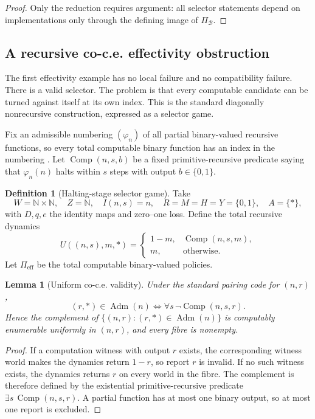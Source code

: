 \documentclass[11pt]{article}
\theoremstyle{plain}
\newtheorem{lemma}[theorem]{Lemma}
\theoremstyle{definition}
\newtheorem{definition}[theorem]{Definition}
\theoremstyle{remark}
\newcommand{\N}{\mathbb{N}}
\newcommand{\Adm}{\operatorname{Adm}}
\begin{document}
\begin{proof}
Only the reduction requires argument: all selector statements depend on
implementations only through the defining image of $\Pi_{\mathcal B}$.
\end{proof}

\subsection{A recursive co-c.e. effectivity obstruction}

The first effectivity example has no local failure and no compatibility failure.
There is a valid selector. The problem is that every computable candidate can be
turned against itself at its own index. This is the standard diagonally
nonrecursive construction, expressed as a selector game.

Fix an admissible numbering $(\varphi_n)$ of all partial binary-valued recursive
functions, so every total computable binary function has an index in the
numbering \cite{rogers}. Let $\operatorname{Comp}(n,s,b)$ be a fixed
primitive-recursive predicate saying that $\varphi_n(n)$ halts within $s$ steps
with output $b\in\{0,1\}$.

\begin{definition}[Halting-stage selector game]\label{def:Kgame}
Take
\[
W=\N\times\N,\quad Z=\N,\quad I(n,s)=n,
\quad R=M=H=Y=\{0,1\},\quad A=\{\ast\},
\]
with $D,q,e$ the identity maps and zero--one loss. Define the total recursive
dynamics
\[
U((n,s),m,\ast)=
\begin{cases}
1-m,&\operatorname{Comp}(n,s,m),\\
m,&\text{otherwise}.
\end{cases}
\]
Let $\Pi_{\mathrm{eff}}$ be the total computable binary-valued policies.
\end{definition}

\begin{lemma}[Uniform co-c.e. validity]\label{lem:Kfibres}
Under the standard pairing code for $(n,r)$,
\[
(r,\ast)\in\Adm(n)
\iff
\forall s\,\neg\operatorname{Comp}(n,s,r).
\]
Hence the complement of
$\{(n,r):(r,\ast)\in\Adm(n)\}$ is computably enumerable uniformly in
$(n,r)$, and every fibre is nonempty.
\end{lemma}

\begin{proof}
If a computation witness with output $r$ exists, the corresponding witness world
makes the dynamics return $1-r$, so report $r$ is invalid. If no such witness
exists, the dynamics returns $r$ on every world in the fibre. The complement is
therefore defined by the existential primitive-recursive predicate
$\exists s\,\operatorname{Comp}(n,s,r)$. A partial function has at most one
binary output, so at most one report is excluded.
\end{proof}
\end{document}
